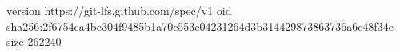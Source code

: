version https://git-lfs.github.com/spec/v1
oid sha256:2f6754ca4bc304f9485b1a70c553c04231264d3b314429873863736a6c48f34e
size 262240

